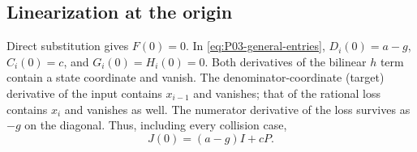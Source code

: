 \subsection{Linearization at the origin}
\label{slot:P03-1}

Direct substitution gives $F(0)=0$. In
\eqref{eq:P03-general-entries}, $D_i(0)=a-g$, $C_i(0)=c$, and
$G_i(0)=H_i(0)=0$. Both derivatives of the bilinear $h$ term
contain a state coordinate and vanish. The denominator-coordinate
(target) derivative of the input contains $x_{i-1}$ and vanishes;
that of the rational loss contains $x_i$ and vanishes as well.
The numerator derivative of the loss survives as $-g$ on the
 diagonal. Thus, including every collision case,
\begin{equation}
 \boxed{J(0)=(a-g)I+cP.}
 \label{eq:P03-origin-jacobian}
\end{equation}

